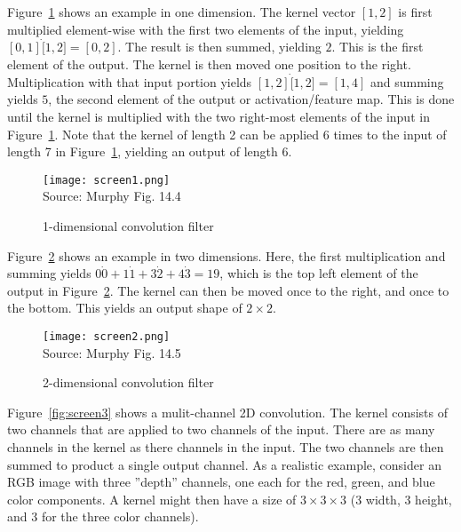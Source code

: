Figure~\ref{fig:screen1_chap16} shows an example in one dimension. The kernel vector $[1, 2]$ is first multiplied element-wise with the first two elements of the input, yielding $[0,1] \dot [1, 2] = [0, 2]$. The result is then summed, yielding $2$. This is the first element of the output. The kernel is then moved one position to the right. Multiplication with that input portion yields $[1, 2] \dot [1, 2] = [1, 4]$ and summing yields $5$, the second element of the output or activation/feature map. This is done until the kernel is multiplied with the two right-most elements of the input in Figure~\ref{fig:screen1_chap16}. Note that the kernel of length 2 can be applied 6 times to the input of length 7 in Figure~\ref{fig:screen1_chap16}, yielding an output of length 6.

\begin{figure}[b]
\centering
\texttt{[image: screen1.png]} \\

\scriptsize Source: Murphy Fig. 14.4 \normalsize
\caption{1-dimensional convolution filter}
\label{fig:screen1_chap16}
\end{figure}

Figure~\ref{fig:screen2_chap16} shows an example in two dimensions. Here, the first multiplication and summing yields $0 \dot 0 + 1 \dot 1 + 3 \dot 2 + 4 \dot 3 = 19$, which is the top left element of the output in Figure~\ref{fig:screen2_chap16}. The kernel can then be moved once to the right, and once to the bottom. This yields an output shape of $2 \times 2$. 

\begin{figure}
\centering
\texttt{[image: screen2.png]} \\

\scriptsize Source: Murphy Fig. 14.5
\caption{2-dimensional convolution filter}
\label{fig:screen2_chap16}
\end{figure}

Figure~\ref{fig:screen3} shows a mulit-channel 2D convolution. The kernel consists of two channels that are applied to two channels of the input. There are as many channels in the kernel as there channels in the input. The two channels are then summed to product a single output channel. As a realistic example, consider an RGB image with three ''depth'' channels, one each for the red, green, and blue color components. A kernel might then have a size of $3\times 3 \times 3$ (3 width, 3 height, and 3 for the three color channels).

